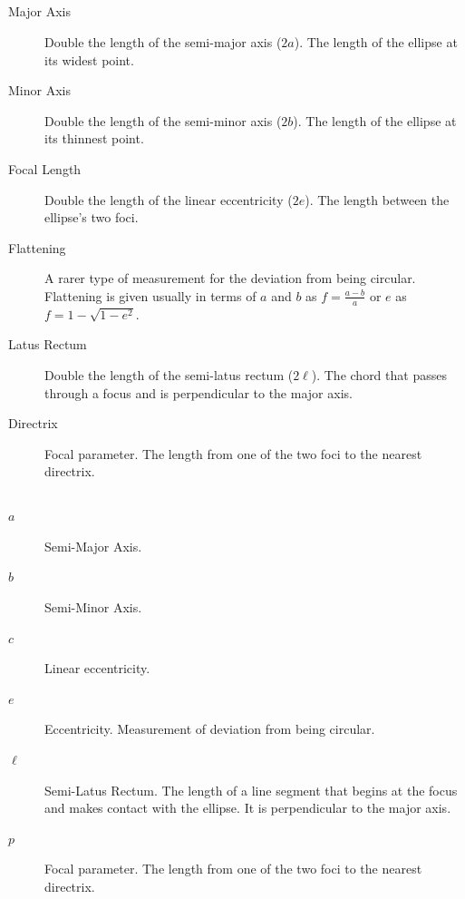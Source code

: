 \documentclass{article}
\begin{document}
\subsection*{}
\begin{description}
\item[Major Axis] Double the length of the semi-major axis ($2a$). The length of the ellipse at its widest point.
\item[Minor Axis] Double the length of the semi-minor axis ($2b$). The length of the ellipse at its thinnest point.
\item[Focal Length] Double the length of the linear eccentricity ($2e$). The length between the ellipse's two foci.
\item[Flattening] A rarer type of measurement for the deviation from being circular. Flattening is given usually in terms of $a$ and $b$ as $f=\frac{a-b}{a}$ or $e$ as $f=1-\sqrt{1-e^2}$. 
\item[Latus Rectum] Double the length of the semi-latus rectum ($2\ell$). The chord that passes through a focus and is perpendicular to the major axis.
\item[Directrix] Focal parameter. The length from one of the two foci to the nearest directrix. 
\end{description}

\subsection*{}
\begin{description}
\item[$a$] Semi-Major Axis.
\item[$b$] Semi-Minor Axis.
\item[$c$] Linear eccentricity.
\item[$e$] Eccentricity. Measurement of deviation from being circular.
\item[$\ell$] Semi-Latus Rectum. The length of a line segment that begins at the focus and makes contact with the ellipse. It is perpendicular to the major axis.
\item[$p$] Focal parameter. The length from one of the two foci to the nearest directrix. 
\end{description}
\newpage
\end{document}
